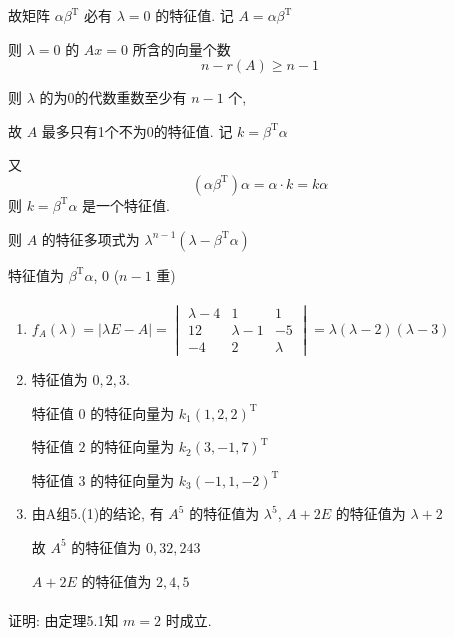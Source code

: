 		 故矩阵 \( \alpha\beta^{\mathrm{T}} \) 必有 \( \lambda = 0 \) 的特征值. 记 \( A = \alpha\beta^{\mathrm{T}} \)

		 则 \( \lambda = 0 \) 的 \( Ax = 0 \) 所含的向量个数
		 \[ n - r(A) \geq n - 1 \]

		 则 \( \lambda \) 的为0的代数重数至少有 \( n-1 \) 个,

		 故 \( A \) 最多只有1个不为0的特征值. 记 \( k = \beta^{\mathrm{T}}\alpha \)

		 又 \[
			 (\alpha\beta^{\mathrm{T}})\alpha = \alpha\cdot k = k\alpha
		 \]
		 则 \( k = \beta^{\mathrm{T}}\alpha \) 是一个特征值.

		 则 \( A \) 的特征多项式为 \( \lambda^{n-1}(\lambda - \beta^{\mathrm{T}}\alpha) \)

		 特征值为 \( \beta^{\mathrm{T}}\alpha \), \( 0 \) (\( n-1 \) 重)

		 \setcounter{paragraph}{4} %
	 \paragraph{} %
		 \begin{enumerate}
			 \item %
			       \( f_{A}(\lambda) = |\lambda E - A| = \begin{vmatrix}
				       \lambda - 4 & 1           & 1       \\
				       12          & \lambda - 1 & -5      \\
				       -4          & 2           & \lambda
			       \end{vmatrix} = \lambda(\lambda - 2)(\lambda - 3) \)
			 \item %
			       特征值为 \( 0, 2, 3 \).

			       特征值 \( 0 \) 的特征向量为 \( k_{1}(1, 2, 2)^{\mathrm{T}} \)

			       特征值 \( 2 \) 的特征向量为 \( k_{2}(3, -1, 7)^{\mathrm{T}} \)

			       特征值 \( 3 \) 的特征向量为 \( k_{3}(-1, 1, -2)^{\mathrm{T}} \)
			 \item %
			       由A组5.(1)的结论, 有 \( A^{5} \) 的特征值为 \( \lambda^{5} \), \( A+2E \) 的特征值为 \( \lambda+2 \)

			       故 \( A^{5} \) 的特征值为 \( 0, 32, 243 \)

			       \( A+2E \) 的特征值为 \( 2, 4, 5 \)
		 \end{enumerate}


	 \paragraph{} %
		 证明: 由定理5.1知 \( m=2 \) 时成立.

